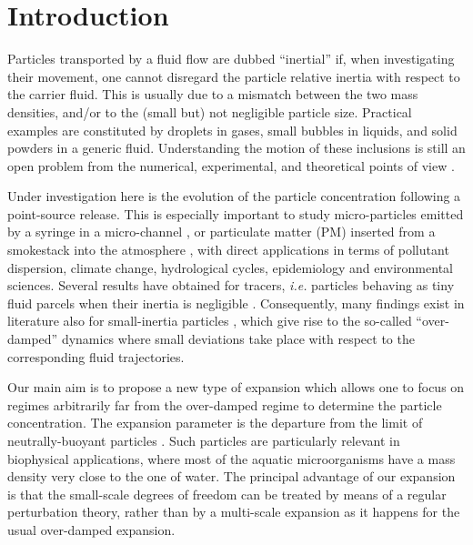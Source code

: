 \section{Introduction} \label{intro}
%
Particles transported by a fluid flow are dubbed ``inertial'' if, when investigating their movement,
one cannot disregard the particle relative inertia with respect to the carrier fluid.
This is usually due to a mismatch between the two mass densities, and/or to the (small but) not negligible particle size.
Practical examples are constituted by droplets in gases, small bubbles in liquids, and solid powders in a generic fluid.
Understanding the motion of these inclusions is still an open problem from the numerical, experimental, and theoretical points of view
\cite{BFF01,WM03,B05,CBBBCLMT06,BCH07,FMPV07,VCVLMPT08}.

Under investigation here is the evolution of the particle concentration following a point-source release.
This is especially important to study micro-particles emitted by a syringe in a micro-channel \cite{MPM14},
or particulate matter (PM) inserted from a smokestack into the atmosphere \cite{BBCCMMPP14},
with direct applications in terms of pollutant dispersion, climate change, hydrological cycles,
epidemiology and environmental sciences.
Several results have obtained for tracers, \emph{i.e.} particles behaving as tiny fluid parcels when their inertia is negligible
\cite{CMAM2006,CMAM2007,CMAM07,T18}.
Consequently, many findings exist in literature also for small-inertia particles \cite{MAM11},
which give rise to the so-called ``over-damped'' dynamics
where small deviations take place with respect to the corresponding fluid trajectories.

Our main aim is to propose a new type of expansion which allows one to focus
on regimes arbitrarily far from the over-damped regime to determine the particle concentration.
The expansion parameter is the departure from the limit of neutrally-buoyant particles \cite{MAG17,MAMGM17}.
Such particles are particularly relevant in biophysical applications,
where most of the aquatic microorganisms \cite{LMAFMS12} have a mass density very close to the one of water.
The principal advantage of our expansion
is that the small-scale degrees of freedom can be treated by means of a regular perturbation
theory, rather than by a multi-scale expansion as it happens for the usual over-damped expansion.

